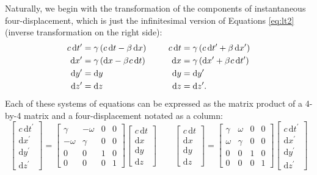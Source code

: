 \documentclass[12pt]{article}
\newcommand{\dd}[1]{\mathrm{d}#1}
\begin{document}
Naturally, we begin with the transformation of the components of instantaneous four-displacement, which is just the infinitesimal version of Equations \ref{eq:lt2} (inverse transformation on the right side):
\begin{equation}\label{eq:fd}
\begin{aligned}
c \, \dd t^{\prime} &= \gamma \left( c \, \dd t - \beta \, \dd x \right) & c \, \dd t &= \gamma \left( c \, \dd t^\prime + \beta \, \dd x^\prime \right) \\
\dd x^{\prime} &= \gamma \left( \dd x - \beta \mkern1mu c \, \dd t \right) & \qquad  \dd x &= \gamma \left( \dd x^\prime + \beta \mkern1mu c \, \dd t^\prime \right) \\
\dd y^{\prime} &= \dd y& \dd y&= \dd y^\prime \\
\dd z^{\prime} &= \dd z& \dd z&= \dd z^\prime .
\end{aligned}
\end{equation}
Each of these systems of equations can be expressed as the matrix product of a 4-by-4 matrix and a four-displacement notated as a column:
\begin{equation*}
\begin{bmatrix}
c \, \dd t^\prime \\ \dd x^\prime \\ \dd y^\prime \\ \dd z^\prime
\end{bmatrix}
=
\begin{bmatrix}
\gamma & -\omega & 0 & 0 \\
- \omega & \gamma & 0 & 0 \\
0 & 0 & 1 & 0 \\
0 & 0 & 0 & 1
\end{bmatrix}
\begin{bmatrix}
c \, \dd t \\ \dd x \\ \dd y \\ \dd z
\end{bmatrix}
\qquad
\begin{bmatrix}
c \, \dd t \\ \dd x \\ \dd y \\ \dd z
\end{bmatrix}
=
\begin{bmatrix}
\gamma & \omega & 0 & 0 \\
\omega & \gamma & 0 & 0 \\
0 & 0 & 1 & 0 \\
0 & 0 & 0 & 1
\end{bmatrix}
\begin{bmatrix}
c \, \dd t^\prime \\ \dd x^\prime \\ \dd y^\prime \\ \dd z^\prime
\end{bmatrix}
\end{equation*}
\end{document}
